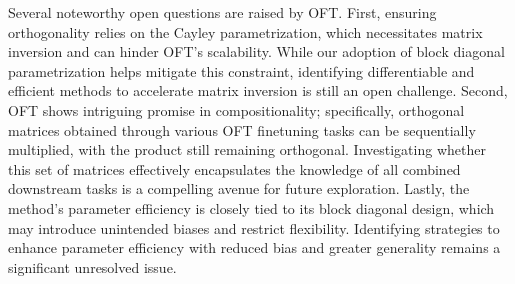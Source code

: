 Several noteworthy open questions are raised by OFT. First, ensuring orthogonality relies on the Cayley parametrization, which necessitates matrix inversion and can hinder OFT’s scalability. While our adoption of block diagonal parametrization helps mitigate this constraint, identifying differentiable and efficient methods to accelerate matrix inversion is still an open challenge. Second, OFT shows intriguing promise in compositionality; specifically, orthogonal matrices obtained through various OFT finetuning tasks can be sequentially multiplied, with the product still remaining orthogonal. Investigating whether this set of matrices effectively encapsulates the knowledge of all combined downstream tasks is a compelling avenue for future exploration. Lastly, the method’s parameter efficiency is closely tied to its block diagonal design, which may introduce unintended biases and restrict flexibility. Identifying strategies to enhance parameter efficiency with reduced bias and greater generality remains a significant unresolved issue.